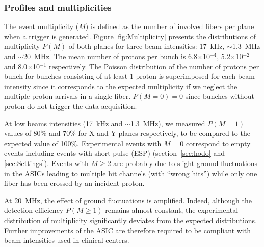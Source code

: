 \documentclass[a4paper,11pt]{article}
\begin{document}
\subsubsection{Profiles and multiplicities}
\label{Profiles_And_Multiplies}

The event multiplicity ($M$) is defined as the number of involved fibers per plane when a trigger is generated. Figure \ref{fig:Multiplicity} presents the distributions of multiplicity $P(M)$ of both planes for three beam intensities: 17~kHz, $\sim$1.3~MHz and $\sim$20~MHz. The mean number of protons per bunch is 6.8$\times$10$^{-4}$, 5.2$\times$10$^{-2}$ and 8.0$\times$10$^{-1}$ respectively. The Poisson distribution of the number of protons per bunch for bunches consisting of at least 1 proton is superimposed for each beam intensity since it corresponds to the expected multiplicity if we neglect the multiple proton arrivals in a single fiber. $P(M=0)=0$ since bunches without proton do not trigger the data acquisition. 

At low beams intensities (17~kHz and $\sim$1.3~MHz), we measured $P(M=1)$ values of 80\% and 70\% for X and Y planes respectively, to be compared to the expected value of 100\%. Experimental events with $M=0$ correspond to empty events including events with short pulse (ESP) (section~\ref{sec:hodo} and \ref{sec:Settings}). Events with $M\ge2$ are probably due to slight ground fluctuations in the ASICs leading to multiple hit channels (with \enquote{wrong hits}) while only one fiber has been crossed by an incident proton. 

At 20~MHz, the effect of ground fluctuations is amplified. Indeed, although the detection efficiency $P(M\ge1)$ remains almost constant, the experimental distribution of multiplicity significantly deviates from the expected distributions. Further improvements of the ASIC are therefore required to be compliant with beam intensities used in clinical centers.
\end{document}
